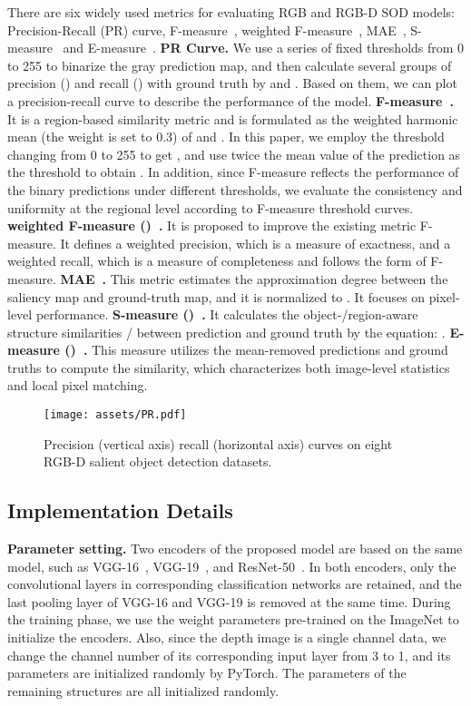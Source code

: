 \documentclass[runningheads]{llncs}
\begin{document}
There are six widely used metrics for evaluating RGB and RGB-D SOD models: Precision-Recall (PR) curve, F-measure~\cite{Fmeasure}, weighted F-measure~\cite{wFmeasure}, MAE~\cite{MAE}, S-measure~\cite{Smeasure} and E-measure~\cite{Emeasure}.
\noindent\textbf{PR Curve.} We use a series of fixed thresholds from 0 to 255 to binarize the gray prediction map, and then calculate several groups of precision () and recall () with ground truth by  and . Based on them, we can plot a precision-recall curve to describe the performance of the model.
\noindent\textbf{F-measure~\cite{Fmeasure}.} It is a region-based similarity metric and is formulated as the weighted harmonic mean (the weight is set to 0.3) of  and . In this paper, we employ the threshold changing from 0 to 255 to get , and use twice the mean value of the prediction  as the threshold to obtain . In addition, since F-measure reflects the performance of the binary predictions under different thresholds, we evaluate the consistency and uniformity at the regional level according to F-measure threshold curves.
\noindent\textbf{weighted F-measure ()~\cite{wFmeasure}.} It is proposed to improve the existing metric F-measure. It defines a weighted precision, which is a measure of exactness, and a weighted recall, which is a measure of completeness and follows the form of F-measure.
\noindent\textbf{MAE~\cite{MAE}.} This metric estimates the approximation degree between the saliency map and ground-truth map, and it is normalized to . It focuses on pixel-level performance.
\noindent\textbf{S-measure ()~\cite{Smeasure}.} It calculates the object-/region-aware structure similarities  /  between prediction and ground truth by the equation:
.
\noindent\textbf{E-measure ()~\cite{Emeasure}.} This measure utilizes the mean-removed predictions and ground truths to compute the similarity, which characterizes both image-level statistics and local pixel matching.

\begin{figure}[tp]
 \centering
 \texttt{[image: assets/PR.pdf]}
 \caption{Precision (vertical axis) recall (horizontal axis) curves on eight RGB-D salient object detection datasets.}
 \label{fig:pr}
\end{figure}

\subsection{Implementation Details}

\noindent\textbf{Parameter setting.} Two encoders of the proposed model are based on the same model, such as VGG-16~\cite{VGG}, VGG-19~\cite{VGG}, and ResNet-50~\cite{Resnet}. In both encoders, only the convolutional layers in corresponding classification networks are retained, and the last pooling layer of VGG-16 and VGG-19 is removed at the same time. During the training phase, we use the weight parameters pre-trained on the ImageNet to initialize the encoders. Also, since the depth image is a single channel data, we change the channel number of its corresponding input layer from 3 to 1, and its parameters are initialized randomly by PyTorch. The parameters of the remaining structures are all initialized randomly.
\end{document}
